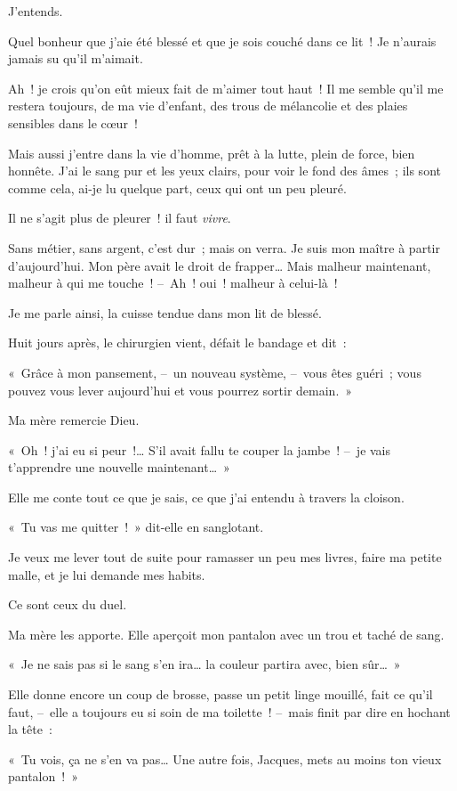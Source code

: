 \documentclass[french,twoside]{book} %
\newcommand{\astertri}{\medskip\par\centerline{\color{rubric}\large\selectfont{\syms ✻\,✻\,✻}}\medskip\par}%
\begin{document}
\astertri

\noindent J’entends.\par
Quel bonheur que j’aie été blessé et que je sois couché dans ce lit ! Je n’aurais jamais su qu’il m’aimait.\par
Ah ! je crois qu’on eût mieux fait de m’aimer tout haut ! Il me semble qu’il me restera toujours, de ma vie d’enfant, des trous de mélancolie et des plaies sensibles dans le cœur !\par
\bigbreak
\noindent Mais aussi j’entre dans la vie d’homme, prêt à la lutte, plein de force, bien honnête. J’ai le sang pur et les yeux clairs, pour voir le fond des âmes ; ils sont comme cela, ai-je lu quelque part, ceux qui ont un peu pleuré.\par
Il ne s’agit plus de pleurer ! il faut \emph{vivre}.\par
Sans métier, sans argent, c’est dur ; mais on verra. Je suis mon maître à partir d’aujourd’hui. Mon père avait le droit de frapper… Mais malheur maintenant, malheur à qui me touche ! – Ah ! oui ! malheur à celui-là !\par
Je me parle ainsi, la cuisse tendue dans mon lit de blessé.\par
Huit jours après, le chirurgien vient, défait le bandage et dit :\par
« Grâce à mon pansement, – un nouveau système, – vous êtes guéri ; vous pouvez vous lever aujourd’hui et vous pourrez sortir demain. »\par
Ma mère remercie Dieu.\par
« Oh ! j’ai eu si peur !… S’il avait fallu te couper la jambe ! – je vais t’apprendre une nouvelle maintenant… »\par
Elle me conte tout ce que je sais, ce que j’ai entendu à travers la cloison.\par
\bigbreak
\noindent « Tu vas me quitter ! » dit-elle en sanglotant.\par
Je veux me lever tout de suite pour ramasser un peu mes livres, faire ma petite malle, et je lui demande mes habits.\par
Ce sont ceux du duel.\par
Ma mère les apporte. Elle aperçoit mon pantalon avec un trou et taché de sang.\par
« Je ne sais pas si le sang s’en ira… la couleur partira avec, bien sûr… »\par
Elle donne encore un coup de brosse, passe un petit linge mouillé, fait ce qu’il faut, – elle a toujours eu si soin de ma toilette ! – mais finit par dire en hochant la tête :\par
« Tu vois, ça ne s’en va pas… Une autre fois, Jacques, mets au moins ton vieux pantalon ! »
 
\end{document}
